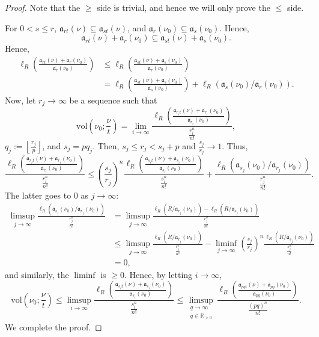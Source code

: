 \documentclass[a4paper,12pt]{amsart}
\theoremstyle{definition} %
\theoremstyle{remark}
\numberwithin{equation}{section}
\newcommand{\R}{\mathbb{R}}
\newcommand{\floor}[1]{\left\lfloor #1 \right\rfloor}
\begin{document}
\begin{proof}
Note that the $\ge $ side is trivial, and hence we will only prove the $\le $ side.

\smallskip

For $0<s\le r$, $\mathfrak{a}_{rt}(\nu)\subseteq \mathfrak{a}_{st}(\nu)$, and $\mathfrak{a}_r(\nu_0)\subseteq \mathfrak{a}_s(\nu_0)$. Hence,
$$ \mathfrak{a}_{rt}(\nu)+\mathfrak{a}_r(\nu_0)\subseteq \mathfrak{a}_{st}(\nu)+\mathfrak{a}_s(\nu_0).$$
Hence,
$$ 
\begin{aligned}
\ell_R\left(\frac{\mathfrak{a}_{rt}(\nu)+\mathfrak{a}_r(\nu_0)}{\mathfrak{a}_r(\nu_0)}\right)&\le \ell_R\left(\frac{\mathfrak{a}_{st}(\nu)+\mathfrak{a}_s(\nu_0)}{\mathfrak{a}_r(\nu_0)}\right)
\\ &=\ell_R\left(\frac{\mathfrak{a}_{st}(\nu)+\mathfrak{a}_s(\nu_0)}{\mathfrak{a}_s(\nu_0)}\right)+\ell_R(\mathfrak{a}_s(\nu_0)/\mathfrak{a}_r(\nu_0)).
\end{aligned}
$$
Now, let $r_j\to \infty$ be a sequence such that
$$\mathrm{vol}\left(\nu_0;\frac{\nu}{t}\right)=\lim_{i\to \infty}\frac{\ell_R\left(\frac{\mathfrak{a}_{r_it}(\nu)+\mathfrak{a}_{r_i}(\nu_0)}{\mathfrak{a}_{r_i}(\nu_0)}\right)}{\frac{r^n_i}{n!}},$$
$q_j:=\floor{\frac{r_j}{p}}$, and $s_j=pq_j$. Then, $s_j\le r_j<s_j+p$ and $\frac{s_j}{r_j}\to 1$. Thus,
$$ \frac{\ell_R\left(\frac{\mathfrak{a}_{r_it}(\nu)+\mathfrak{a}_{r_i}(\nu_0)}{\mathfrak{a}_{r_i}(\nu_0)}\right)}{\frac{r^n_i}{n!}}\le \left(\frac{s_j}{r_j}\right)^n\frac{\ell_R\left(\frac{\mathfrak{a}_{s_it}(\nu)+\mathfrak{a}_{s_i}(\nu_0)}{\mathfrak{a}_{s_i}(\nu_0)}\right)}{\frac{s^n_i}{n!}}+\frac{\ell_R(\mathfrak{a}_{s_j}(\nu_0)/\mathfrak{a}_{r_j}(\nu_0))}{\frac{r^n_j}{n!}}.$$
The latter goes to $0$ as $j\to \infty$:
$$ 
\begin{aligned}
\limsup_{j\to \infty}\frac{\ell_R(\mathfrak{a}_{s_j}(\nu_0)/\mathfrak{a}_{r_j}(\nu_0))}{\frac{r^n_j}{n!}}&=\limsup_{j\to \infty}\frac{\ell_R(R/\mathfrak{a}_{r_j}(\nu_0))-\ell_R(R/\mathfrak{a}_{s_j}(\nu_0))}{\frac{r^n_j}{n!}}
\\ &\le \limsup_{j\to \infty}\frac{\ell_R(R/\mathfrak{a}_{r_j}(\nu_0))}{\frac{r^n_j}{n!}}-\liminf_{j\to \infty}\left(\frac{s_j}{r_j}\right)^n\frac{\ell_R(R/\mathfrak{a}_{s_j}(\nu_0))}{\frac{s^n_j}{n!}}
\\ &=0,
\end{aligned}
$$
and similarly, the $\liminf$ is $\ge 0$. Hence, by letting $i\to \infty$,
$$ \mathrm{vol}\left(\nu_0;\frac{\nu}{t}\right)\le \limsup_{i\to \infty}\frac{\ell_R\left(\frac{\mathfrak{a}_{s_it}(\nu)+\mathfrak{a}_{s_i}(\nu_0)}{\mathfrak{a}_{s_i}(\nu_0)}\right)}{\frac{s^n_i}{n!}}\le \limsup_{\substack{q\to \infty \\ q\in \R_{>0}}}\frac{\ell_R\left(\frac{\mathfrak{a}_{pqt}(\nu)+\mathfrak{a}_{pq}(\nu_0)}{\mathfrak{a}_{pq}(\nu_0)}\right)}{\frac{(pq)^n}{n!}}.$$
We complete the proof.
\end{proof}
\end{document}
